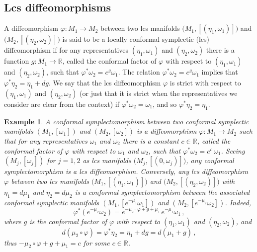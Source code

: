 \documentclass{amsart}
\newtheorem{example}[thm]{Example}
\theoremstyle{remark}
\begin{document}
\subsection{Lcs diffeomorphisms}

A diffeomorphism $\varphi: M_1 \rightarrow M_2$
between two lcs manifolds $\big(M_1, [(\eta_1, \omega_1 )]\big)$
and $\big(M_2, [(\eta_2, \omega_2 )]\big)$
is said to be a locally conformal symplectic (lcs) diffeomorphism
if for any representatives $(\eta_1, \omega_1)$ and $(\eta_2, \omega_2)$
there is a function $g: M_1 \rightarrow \mathbb{R}$,
called the conformal factor of $\varphi$
with respect to $(\eta_1, \omega_1)$ and $(\eta_2, \omega_2)$,
such that $\varphi^{\ast} \omega_2 = e^g \omega_1$.
The relation $\varphi^{\ast} \omega_2 = e^g \omega_1$
implies that $\varphi^{\ast} \eta_2 = \eta_1 + dg$.
We say that the lcs diffeomorphism $\varphi$ is strict
with respect to $(\eta_1, \omega_1)$ and $(\eta_2, \omega_2)$
(or just that it is strict
when the representatives we consider are clear from the context)
if $\varphi^{\ast} \omega_2 = \omega_1$,
and so $\varphi^{\ast} \eta_2 = \eta_1$.

\begin{example}
A conformal symplectomorphism
between two conformal symplectic manifolds
$(M_1, [\omega_1])$ and $(M_2, [\omega_2])$
is a diffeomorphism $\varphi: M_1 \rightarrow M_2$
such that for any representatives
$\omega_1$ and $\omega_2$
there is a constant $c \in \mathbb{R}$,
called the conformal factor of $\varphi$
with respect to $\omega_1$ and $\omega_2$,
such that $\varphi^{\ast} \omega_2 = e^c \, \omega_1$.
Seeing $(M_j, [\omega_j])$ for $j = 1, 2$
as lcs manifolds $\big( M_j , [(0, \omega_j)] \big)$,
any conformal symplectomorphism is a lcs diffeomorphism.
Conversely,
any lcs diffeomorphism $\varphi$
between two lcs manifolds $\big( M_1, [(\eta_1, \omega_1)] \big)$
and $\big( M_2, [(\eta_2, \omega_2)] \big)$
with $\eta_1 = d\mu_1$ and $\eta_2 = d\mu_2$
is a conformal symplectomorphism
between the associated conformal symplectic manifolds
$(M_1, [e^{-\mu_1}\omega_1])$ and $(M_2, [e^{-\mu_2}\omega_2])$.
Indeed,
\[
\varphi^{\ast} (e^{-\mu_2}\omega_2)
= e^{- \mu_2 \circ \varphi + g + \mu_1} \, e^{-\mu_1} \omega_1 \,,
\]
where $g$ is the conformal factor of $\varphi$
with respect to $(\eta_1, \omega_1)$ and $(\eta_2, \omega_2)$,
and
\[
d (\mu_2 \circ \varphi) = \varphi^{\ast}\eta_2
= \eta_1 + dg = d (\mu_1 + g) \,,
\]
thus $- \mu_2 \circ \varphi + g + \mu_1 = c$
for some $c \in \mathbb{R}$.
\end{example}
\end{document}
